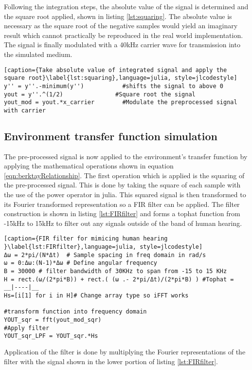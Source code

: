 Following the integration steps, the absolute value of the signal is determined and the square root applied, shown in listing \ref{lst:squaring}. The absolute value is necessary as the square root of the negative samples would yield an imaginary result which cannot practically be reproduced in the real world implementation. The signal is finally modulated with a 40kHz carrier wave for transmission into the simulated medium.

\begin{lstlisting}[caption={Take absolute value of integrated signal and apply the square root}\label{lst:squaring},language=julia, style=jlcodestyle]
y'' = y''.-minimum(y'')           #shifts the signal to above 0
yout = y''.^(1/2)               #Square root the signal
yout_mod = yout.*x_carrier        #Modulate the preprocessed signal with carrier
\end{lstlisting}

\subsection{Environment transfer function simulation}
The pre-processed signal is now applied to the environment's transfer function by applying the mathematical operations shown in equation \ref{eqn:berktayRelationship}. The first operation which is applied is the squaring of the pre-processed signal. This is done by taking the square of each sample with the use of the power operator in julia. This squared signal is then transformed to its Fourier transformed representation so a FIR filter can be applied. The filter construction is shown in listing \ref{lst:FIRfilter} and forms a tophat function from -15kHz to 15kHz to filter out any signals outside of the band of human hearing.

\begin{lstlisting}[caption={FIR filter for mimicing human hearing }\label{lst:FIRfilter},language=julia, style=jlcodestyle]
Δω = 2*pi/(N*Δt)  # Sample spacing in freq domain in rad/s
ω = 0:Δω:(N-1)*Δω # Define angular frequency 
B = 30000 # filter bandwidth of 30KHz to span from -15 to 15 KHz
H = rect.(ω/(2*pi*B)) + rect.( (ω .- 2*pi/Δt)/(2*pi*B) ) #Tophat = __|----|__
Hs=[i[1] for i in H]# Change array type so iFFT works

#transform function into frequency domain
YOUT_sqr = fft(yout_mod_sqr)
#Apply filter
YOUT_sqr_LPF = YOUT_sqr.*Hs
\end{lstlisting}

Application of the filter is done by multiplying the Fourier representations of the filter with the signal shown in the lower portion of listing \ref{lst:FIRfilter}.\\

